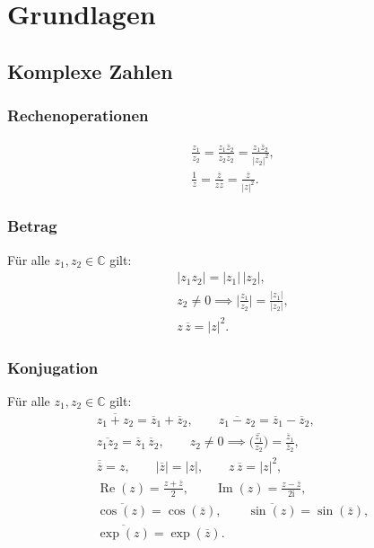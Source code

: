 \documentclass[a4paper,10pt,fleqn,twocolumn,twoside,openany]{book}
\numberwithin{equation}{chapter}
\newcommand{\ui}{\mathrm i}
\begin{document}
\tableofcontents



\chapter{Grundlagen}
\section{Komplexe Zahlen}
\subsection{Rechenoperationen}

\begin{gather}
\frac{z_1}{z_2}
= \frac{z_1\overline z_2}{z_2\overline z_2}
= \frac{z_1\overline z_2}{|z_2|^2},\\
\frac{1}{z} = \frac{\overline z}{z\overline z}
= \frac{\overline z}{|z|^2}.
\end{gather}

\subsection{Betrag}
Für alle $z_1,z_2\in\mathbb C$ gilt:
\begin{gather}
|z_1z_2| = |z_1|\,|z_2|,\\
z_2\ne 0\implies \Big|\frac{z_1}{z_2}\Big|
= \frac{|z_1|}{|z_2|},\\
z\,\overline z = |z|^2.
\end{gather}

\subsection{Konjugation}
Für alle $z_1,z_2\in\mathbb C$ gilt:
\begin{gather}
\overline{z_1+z_2} = \overline z_1+\overline z_2,\qquad
\overline{z_1-z_2} = \overline z_1-\overline z_2,\\
\overline{z_1 z_2} = \overline z_1\,\overline z_2,\qquad
z_2\ne 0 \implies \overline{\Big(\frac{z_1}{z_2}\Big)}
= \frac{\overline z_1}{\overline z_2},\\
\overline{\overline z}=z,\qquad
|\overline{z}| = |z|,\qquad
z\,\overline z = |z|^2,\\
\operatorname{Re}(z) = \frac{z+\overline z}{2},\qquad
\operatorname{Im}(z) = \frac{z-\overline z}{2\ui},\\
\overline{\cos(z)} = \cos(\overline z),\qquad
\overline{\sin(z)} = \sin(\overline z),\\
\overline{\exp(z)} = \exp(\overline z).
\end{gather}
\end{document}
